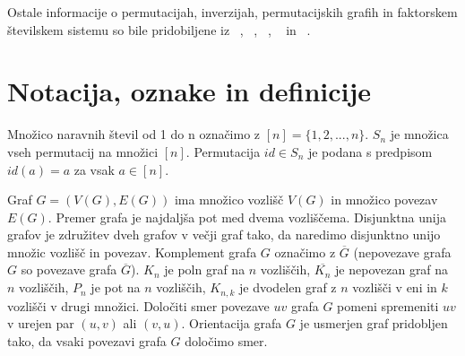 \documentclass[a4paper, 12pt]{book}
\begin{document}
Ostale informacije o permutacijah, inverzijah, permutacijskih grafih in faktorskem številskem sistemu so bile pridobiljene iz ~\cite{permutation}, ~\cite{inversion}, ~\cite{permutationGraph}, ~\cite{permutationGroup} in ~\cite{factorialNumberSystem}.



\section{ Notacija, oznake in definicije }
Množico naravnih števil od 1 do n označimo z $[n] = \{ 1, 2,..., n\}$. $S_n$ je množica vseh permutacij na množici $[n]$. Permutacija $id \in S_n$ je podana s predpisom $id(a) = a$ za vsak $a \in [n]$.

Graf $G = (V(G), E(G))$ ima množico vozlišč $V(G)$ in množico povezav $E(G)$. Premer grafa je najdaljša pot med dvema vozliščema. Disjunktna unija grafov je združitev dveh grafov v večji graf tako, da naredimo disjunktno unijo množic vozlišč in povezav. Komplement grafa $G$ označimo z $\overline{G}$ (nepovezave grafa $G$ so povezave grafa $\overline{G}$). $K_n$ je poln graf na $n$ vozliščih, $\overline{K_n}$ je nepovezan graf na $n$ vozliščih, $P_n$ je pot na $n$ vozliščih, $K_{n, k}$ je dvodelen graf z $n$ vozlišči v eni in $k$ vozlišči v drugi množici. Določiti smer povezave $uv$ grafa $G$ pomeni spremeniti $uv$ v urejen par $(u, v)$ ali $(v, u)$. Orientacija grafa $G$ je usmerjen graf pridobljen tako, da vsaki povezavi grafa $G$ določimo smer.
\end{document}
